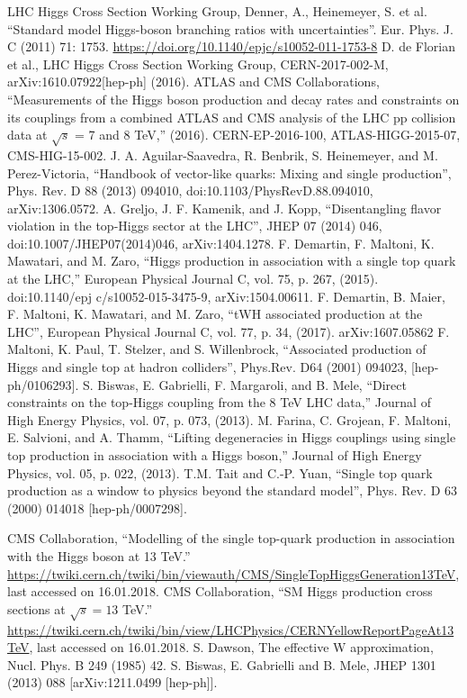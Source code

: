 \documentclass[print]{nuthesis}
\begin{document}
\begin{thebibliography}{300}
 LHC Higgs Cross Section Working Group, Denner, A., Heinemeyer, S. et al. ``Standard model Higgs-boson branching ratios with uncertainties''. Eur. Phys. J. C (2011) 71: 1753. \url{https://doi.org/10.1140/epjc/s10052-011-1753-8}
 D. de Florian et al., LHC Higgs Cross Section Working Group, CERN-2017-002-M, arXiv:1610.07922[hep-ph] (2016).
 ATLAS and CMS Collaborations, ``Measurements of the Higgs boson production and decay rates and constraints on its couplings from a combined ATLAS and CMS analysis of the LHC pp collision data at $\sqrt{s}$ = 7 and 8 TeV,'' (2016). CERN-EP-2016-100, ATLAS-HIGG-2015-07, CMS-HIG-15-002.  
 J. A. Aguilar-Saavedra, R. Benbrik, S. Heinemeyer, and M. Perez-Victoria, ``Handbook of vector-like quarks: Mixing and single production'', Phys. Rev. D 88 (2013) 094010, doi:10.1103/PhysRevD.88.094010, arXiv:1306.0572.
A. Greljo, J. F. Kamenik, and J. Kopp, ``Disentangling flavor violation in the top-Higgs sector at the LHC'', JHEP 07 (2014) 046, doi:10.1007/JHEP07(2014)046, arXiv:1404.1278.
 F. Demartin, F. Maltoni, K. Mawatari, and M. Zaro, ``Higgs production in association with a single top quark at the LHC,'' European Physical Journal C, vol. 75, p. 267, (2015). doi:10.1140/epj
c/s10052-015-3475-9, arXiv:1504.00611.
 F. Demartin, B. Maier, F. Maltoni, K. Mawatari, and M. Zaro, ``tWH associated production at the LHC'', European Physical Journal C, vol. 77, p. 34, (2017). arXiv:1607.05862
 F. Maltoni, K. Paul, T. Stelzer, and S. Willenbrock, ``Associated production of Higgs and single top at hadron colliders'', Phys.Rev. D64 (2001) 094023, [hep-ph/0106293].
 S. Biswas, E. Gabrielli, F. Margaroli, and B. Mele, ``Direct constraints on the top-Higgs coupling from the 8 TeV LHC data,'' Journal of High Energy Physics, vol. 07, p. 073, (2013).
 M. Farina, C. Grojean, F. Maltoni, E. Salvioni, and A. Thamm, ``Lifting degeneracies in Higgs couplings using single top production in association with a Higgs boson,'' Journal of High Energy Physics, vol. 05, p. 022, (2013).
 T.M. Tait and C.-P. Yuan, ``Single top quark production as a window to physics beyond the standard model'', Phys. Rev. D 63 (2000) 014018 [hep-ph/0007298].

 CMS Collaboration, ``Modelling of the single top-quark production in association with the Higgs boson at 13 TeV.'' \url{https://twiki.cern.ch/twiki/bin/viewauth/CMS/SingleTopHiggsGeneration13TeV}, last accessed on 16.01.2018.
 CMS Collaboration, ``SM Higgs production cross sections at $\sqrt{s} = 13$ TeV.'' \url{https://twiki.cern.ch/twiki/bin/view/LHCPhysics/CERNYellowReportPageAt13TeV}, last accessed on 16.01.2018.
 S. Dawson, The effective W approximation, Nucl. Phys. B 249 (1985) 42.
 S. Biswas, E. Gabrielli and B. Mele, JHEP 1301 (2013) 088 [arXiv:1211.0499 [hep-ph]].


\end{thebibliography}
\end{document}
